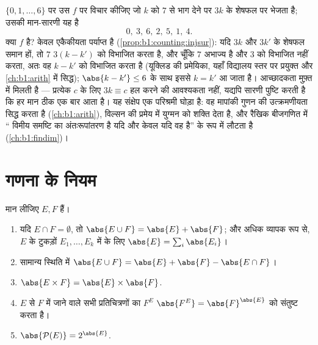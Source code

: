 \begin{example}[आधा काम, मुफ़्त में]\label{ex:b1:counting:mod7}
$\{0, 1, \dots, 6\}$ पर उस  $f$ पर विचार कीजिए जो $k$ को $7$ से
भाग देने पर $3k$ के शेषफल पर भेजता है; उसकी मान-सारणी यह है
\[
0,\ 3,\ 6,\ 2,\ 5,\ 1,\ 4 .
\]
क्या $f$  है? केवल एकैकीयता पर्याप्त है
(\cref{prop:b1:counting:injsur}): यदि $3k$ और $3k'$ के शेषफल समान हों, तो
$7$ $3(k - k')$ को विभाजित करता है, और चूँकि $7$ अभाज्य है और $3$ को विभाजित
नहीं करता, अतः वह $k - k'$ को विभाजित करता है (यूक्लिड की प्रमेयिका, यहाँ
विद्यालय स्तर पर प्रयुक्त और \cref{ch:b1:arith} में सिद्ध); $\abs{k - k'}
\leq 6$ के साथ इससे $k = k'$ आ जाता है। आच्छादकता मुफ़्त में मिलती है ---
प्रत्येक $c$ के लिए $3k \equiv c$ हल करने की आवश्यकता नहीं, यद्यपि सारणी
पुष्टि करती है कि हर मान ठीक एक बार आता है। यह संक्षेप एक परिश्रमी घोड़ा है:
वह मापांकी गुणन की उत्क्रमणीयता सिद्ध करता है (\cref{ch:b1:arith}), विल्सन
की प्रमेय में युग्मन को शक्ति देता है, और रैखिक बीजगणित में `` विमीय
समष्टि का अंतःरूपांतरण  है यदि और केवल यदि वह  है'' के रूप में
लौटता है (\cref{ch:b1:findim})।
\end{example}

\section{गणना के नियम}

\begin{proposition}[योग और गुणन नियम]\label{prop:b1:counting:rules}
मान लीजिए $E, F$  हैं।
\begin{enumerate}
  \item यदि $E \cap F = \emptyset$, तो $\abs{E \cup F} = \abs{E} + \abs{F}$;
  और अधिक व्यापक रूप से, $E$ के टुकड़ों $E_1, \dots, E_k$ में  के लिए
  $\abs{E} = \sum_i \abs{E_i}$।
  \item सामान्य स्थिति में $\abs{E \cup F} = \abs{E} + \abs{F} - \abs{E \cap
  F}$।
  \item $\abs{E \times F} = \abs{E} \times \abs{F}$.
  \item $E$ से $F$ में जाने वाले सभी प्रतिचित्रणों का  $F^E$
  $\abs{F^E} = \abs{F}^{\abs{E}}$ को संतुष्ट करता है।
  \item $\abs{\mathcal{P}(E)} = 2^{\abs{E}}$.
\end{enumerate}
\end{proposition}

